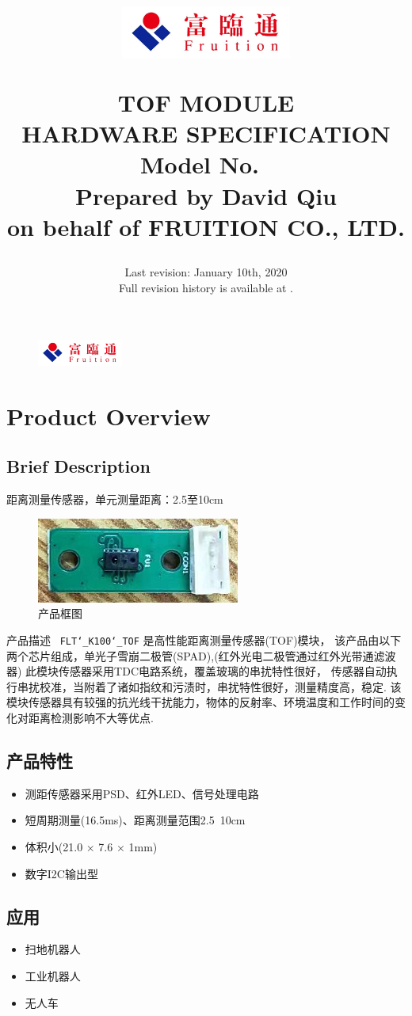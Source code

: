 \documentclass{scrreprt}
\title{
	\begin{figure}[H]
		\centering\includegraphics[width=0.5\textwidth]{logo.jpeg}
	\end{figure}
	\vspace{1cm}
	\flushright
	\Huge{TOF MODULE}\\
	\Huge{HARDWARE SPECIFICATION}\\
	\vspace{2cm}
	\huge{Model No.\ \modelno}\\
	\vspace{2cm}
	\LARGE{Prepared by David Qiu \\ on behalf of FRUITION CO., LTD.}
}
\date{
	Last revision: January 10th, 2020 \\
	Full revision history is available at \upstream.
}
\newcommand{\pchapter}[1]{
	\begingroup\let\clearpage\relax
	\newpage
	\begin{figure}[H]
		\includegraphics[width=0.25\textwidth]{logo.jpeg}
	\end{figure}
	\chapter{#1}
	\endgroup
}
\newcommand{\modelno}{
	\texttt{FLT\char`_K100\char`_TOF}
}
\newcommand{\x}{
	$\times$
}
\begin{document}
\begin{CJK*}{UTF8}{gbsn}
\maketitle
\tableofcontents

\pchapter{Product Overview}
\section{Brief Description}
距离测量传感器，单元测量距离：2.5至10cm

\begin{figure}[H]
\center\includegraphics{tof-picture.png}
\caption{产品框图}
\end{figure}

产品描述\ \modelno 是高性能距离测量传感器(TOF)模块，
该产品由以下两个芯片组成，单光子雪崩二极管(SPAD),(红外光电二极管通过红外光带通滤波器)
此模块传感器采用TDC电路系统，覆盖玻璃的串扰特性很好，
传感器自动执行串扰校准，当附着了诸如指纹和污渍时，串扰特性很好，测量精度高，稳定.
该模块传感器具有较强的抗光线干扰能力，物体的反射率、环境温度和工作时间的变化对距离检测影响不大等优点.

\section{产品特性}
\begin{itemize}
	\item 测距传感器采用PSD、红外LED、信号处理电路
	\item 短周期测量(16.5ms)、距离测量范围2.5~10cm
	\item 体积小(21.0\x7.6\x1mm)
	\item 数字I2C输出型
\end{itemize}

\section{应用}
\begin{itemize}
	\item 扫地机器人
	\item 工业机器人
	\item 无人车
\end{itemize}


\end{CJK*}
\end{document}
